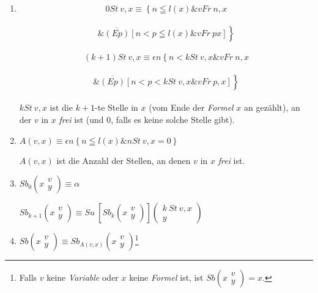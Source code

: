 \documentclass[draft]{scrartcl}
\begin{document}
\begin{enumerate}[1.]
	\item {}$$
		0 St\ v, x \equiv \left\{ n \leqq l\left(x\right) \& v Fr\ n, x \right.
	$$\\[\spacebetweenbreakedequations]
	$$\left.\& \overline{\left(Ep\right)} \left[n < p \leqq l\left(x\right) \& v Fr\ p x\right]\right\}
	$$\\[\spaceafterbreakedequation]

	$$
	\left(k + 1\right) St\ v, x \equiv \epsilon n \left\{n < k St\ v, x \& v Fr\ n, x \right.
	$$\\[\spacebetweenbreakedequations]
	$$
		\left.\& \overline{\left(Ep\right)} \left[n < p < k St\ v, x \& v Fr\ p, x\right]\right\}
	$$\\[\spaceafterbreakedequation]

	$k St\ v, x$ ist die $k + 1$-te Stelle in $x$ (vom Ende der \textit{Formel} $x$ an gezählt), an der $v$ in $x$ \textit{frei} ist (und 0, falls es keine solche Stelle gibt).

	\item $A\left(v, x\right) \equiv \epsilon n\left\{ n \leqq l\left(x\right) \& n St\ v, x = 0\right\}$%

	$A\left(v, x\right)$ ist die Anzahl der Stellen, an denen $v$ in $x$ \textit{frei} ist.

	\item $Sb_0 \left(x\substack{v\\y }\right) \equiv \alpha$%

	$Sb_{k + 1} \left(x\substack{v\\y}\right) \equiv Su\ \left[Sb_k\left(x\substack{v\\y}\right)\right] \left(\substack{k\ St\ v, x\\y}\right)$%

	\item $Sb\left(x\substack{v\\y}\right) \equiv Sb_{A\left(v, x\right)}\left(x\substack{v\\y}\right)$\footnote{Falls $v$ keine \textit{Variable} oder $x$ keine \textit{Formel} ist, ist $Sb\left(x\substack{v\\y}\right) = x$.}


\end{enumerate}
\end{document}
